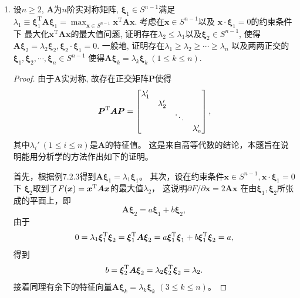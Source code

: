 \begin{2a}
\begin{enumerate}
\item 设\(n\geqslant 2\), \(\boldsymbol{A}\)为\(n\)阶实对称矩阵, 
\(\boldsymbol{\xi}_1\in S^{n-1}\)满足
\(\lambda_1\equiv \boldsymbol{\xi}_1^{\mathrm{T}}\boldsymbol{A}\boldsymbol{\xi}_1
=\max_{\boldsymbol{x}\in S^{n-1}}\boldsymbol{x}^{\mathrm{T}}\boldsymbol{A}\boldsymbol{x}.\)
考虑在\(\boldsymbol{x}\in S^{n-1}\)以及
\(\boldsymbol{x}\cdot\boldsymbol{\xi}_1=0\)的约束条件下
最大化\(\boldsymbol{x}^{\mathrm{T}}\boldsymbol{A}\boldsymbol{x}\)的最大值问题, 
证明存在\(\lambda_2\leqslant\lambda_1\)以及\(\boldsymbol{\xi}_2\in S^{n-1}\), 
使得\(\boldsymbol{A\xi}_2=\lambda_2\boldsymbol{\xi}_2,\boldsymbol{\xi}_2\cdot\boldsymbol{\xi}_1=0\). 
一般地, 证明存在\(\lambda_1\geqslant \lambda_2\geqslant\cdots\geqslant\lambda_n\)
以及两两正交的\(\boldsymbol{\xi}_1,\boldsymbol{\xi}_2,\cdots,\boldsymbol{\xi}_n\in S^{n-1}\)
使得\(\boldsymbol{A}\boldsymbol{\xi}_k=\lambda_k\boldsymbol{\xi}_k\ (1\leqslant k\leqslant n)\).
\begin{proof}
由于\(\boldsymbol{A}\)实对称, 故存在正交矩阵\(\boldsymbol{P}\)使得
\[\boldsymbol{P}^{\rm T}\boldsymbol{AP}=\begin{bmatrix}
\lambda_1'&&&\\
&\lambda_2'&&\\
&&\ddots&\\
&&&\lambda_n'
\end{bmatrix},\]
其中\(\lambda_i'\ (1\leqslant i\leqslant n)\)是\(\boldsymbol{A}\)的特征值。
这是来自高等代数的结论，本题旨在说明能用分析学的方法作出如下的证明。

首先，根据例7.2.3得到\(\boldsymbol{A}\boldsymbol{\xi}_1=\lambda_1\boldsymbol{\xi}_1\)。
其次，设在约束条件\(\boldsymbol{x}\in S^{n-1},\boldsymbol{x}\cdot\boldsymbol{\xi}_1=0\)下
\(\boldsymbol{\xi}_2\)取到了\(F(\boldsymbol{x})=\boldsymbol{x}^{\rm T}\boldsymbol{A}\boldsymbol{x}\)的最大值\(\lambda_2\)，
这说明$\partial F/\partial\boldsymbol{x}=2\boldsymbol{A}\boldsymbol{x}$
在由$\boldsymbol{\xi}_1,\boldsymbol{\xi}_2$所张成的平面上，即
\[\boldsymbol{A}\boldsymbol{\xi}_2=a\boldsymbol{\xi}_1+b\boldsymbol{\xi}_2,\]
由于\[0=\lambda_1\boldsymbol{\xi}^{\rm T}_1\boldsymbol{\xi}_2
=\boldsymbol{\xi}^{\rm T}_1\boldsymbol{A}\boldsymbol{\xi}_2
=a\boldsymbol{\xi}^{\rm T}_1\boldsymbol{\xi}_1+b\boldsymbol{\xi}^{\rm T}_1\boldsymbol{\xi}_2=a,\]
得到\[b=\boldsymbol{\xi}^{\rm T}_2\boldsymbol{A}\boldsymbol{\xi}_2
=\lambda_2\boldsymbol{\xi}^{\rm T}_2\boldsymbol{\xi}_2=\lambda_2.\]
接着同理有余下的特征向量$\boldsymbol{A}\boldsymbol{\xi}_k=\lambda_k\boldsymbol{\xi}_k$ $(3\leqslant k\leqslant n)$。
\end{proof}


\end{enumerate}
\end{2a}
